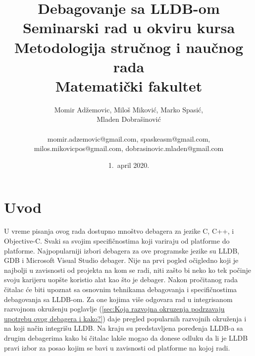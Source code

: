 \documentclass[a4paper]{article}
\begin{document}
\title{Debagovanje sa LLDB-om\\ \small{Seminarski rad u okviru kursa\\Metodologija stručnog i naučnog rada\\ Matematički fakultet}}

\author{Momir Adžemovic, Miloš Miković, Marko Spasić,\\ Mladen Dobrašinović\\ \\ \small momir.adzemovic@gmail.com, spaskeasm@gmail.com,\\ \small milos.mikovicpos@gmail.com, dobrasinovic.mladen@gmail.com}

\date{1.~april 2020.}

\maketitle


\tableofcontents

\newpage

\section{Uvod}
\label{sec:uvod}

U vreme pisanja ovog rada dostupno mnoštvo debagera za jezike C, C++, i Objective-C. Svaki sa svojim specifičnostima koji variraju od platforme do platforme. Najpopularniji izbori debagera za ove programske jezike su LLDB, GDB i Microsoft Visual Studio debager. Nije na prvi pogled očigledno koji je najbolji u zavisnosti od projekta na kom se radi, niti zašto bi neko ko tek počinje svoju karijeru uopšte koristio alat kao što je debager.
Nakon pročitanog rada čitalac će biti upoznat sa osnovnim tehnikama debagovanja i specifičnostima debagovanja sa LLDB-om. Za one kojima više odgovara rad u integrisanom razvojnom okruženju poglavlje (\ref{sec:Koja razvojna okruzenja podrzavaju upotrebu ovog debagera i kako?}) daje pregled popularnih razvojnih okruženja i na koji način integrišu LLDB. Na kraju su predstavljena poređenja LLDB-a sa drugim debagerima kako bi čitalac lakše mogao da donese odluku da li je LLDB pravi izbor za posao kojim se bavi u zavisnosti od platforme na kojoj radi. 
\end{document}
